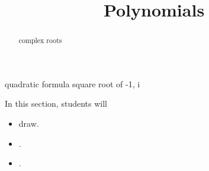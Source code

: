 \documentclass{ximera}
\title{Polynomials}
\begin{document}
\begin{abstract}
complex roots
\end{abstract}
\maketitle



quadratic formula square root of -1, i
























\begin{sectionOutcomes}
In this section, students will 

\begin{itemize}
\item draw.
\item .
\item .
\end{itemize}
\end{sectionOutcomes}
\end{document}
